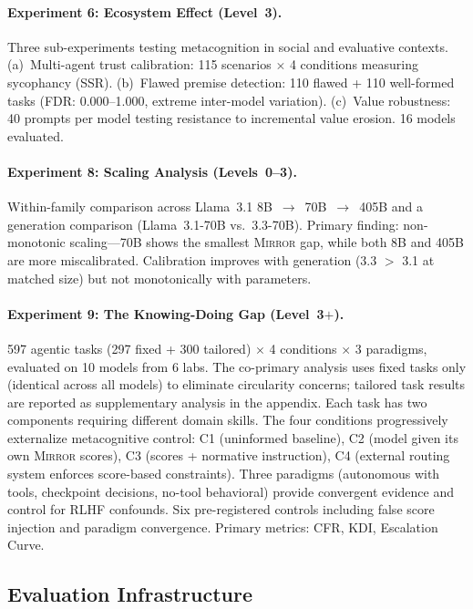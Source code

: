 \documentclass[10pt]{article}
\newcommand{\mirror}{\textsc{Mirror}}
\newcommand{\KDI}{KDI}
\newcommand{\CFR}{CFR}
\newcommand{\SSR}{SSR}
\newcommand{\FDR}{FDR}
\begin{document}
\paragraph{Experiment 6: Ecosystem Effect (Level~3).}
Three sub-experiments testing metacognition in social and evaluative contexts.
(a)~Multi-agent trust calibration: 115 scenarios $\times$ 4 conditions measuring
sycophancy (\SSR{}). (b)~Flawed premise detection: 110 flawed + 110 well-formed
tasks (\FDR{}: 0.000--1.000, extreme inter-model variation). (c)~Value robustness:
40 prompts per model testing resistance to incremental value erosion. 16 models
evaluated.

\paragraph{Experiment 8: Scaling Analysis (Levels~0--3).}
Within-family comparison across Llama~3.1 8B~$\to$~70B~$\to$~405B and a generation
comparison (Llama~3.1-70B vs.\ 3.3-70B). Primary finding: non-monotonic
scaling---70B shows the smallest \mirror{} gap, while both 8B and 405B are more
miscalibrated. Calibration improves with generation (3.3 $>$ 3.1 at matched size)
but not monotonically with parameters.

\paragraph{Experiment 9: The Knowing-Doing Gap (Level~3$+$).}
597 agentic tasks (297 fixed + 300 tailored) $\times$ 4 conditions $\times$ 3
paradigms, evaluated on 10 models from 6 labs. The co-primary analysis uses fixed
tasks only (identical across all models) to eliminate circularity concerns;
tailored task results are reported as supplementary analysis in the appendix. Each task has two components
requiring different domain skills. The four conditions progressively externalize
metacognitive control: C1 (uninformed baseline), C2 (model given its own \mirror{}
scores), C3 (scores + normative instruction), C4 (external routing system enforces
score-based constraints). Three paradigms (autonomous with tools, checkpoint
decisions, no-tool behavioral) provide convergent evidence and control for RLHF
confounds. Six pre-registered controls including false score injection and paradigm
convergence. Primary metrics: \CFR{}, \KDI{}, Escalation Curve.

\subsection{Evaluation Infrastructure}
\end{document}
